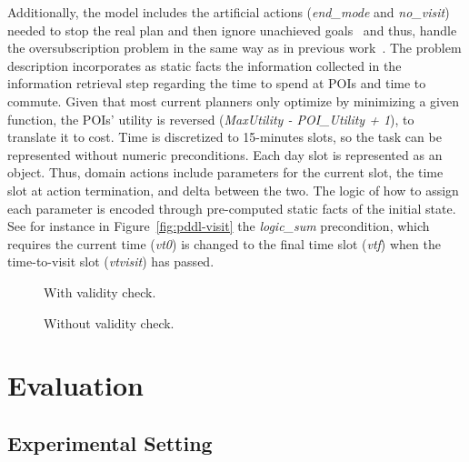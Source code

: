 \documentclass[letterpaper]{article}
\newcommand{\gpt}{{\sc GPT-4}\xspace}
\newcommand{\approach}{\ensuremath{\textsc{TRIP-PAL}}\xspace}
\begin{document}
Additionally, the model includes the artificial actions (\textit{end\_mode} and \textit{no\_visit}) needed to stop the real plan and then ignore unachieved goals~\cite{keyder2009soft} and thus, handle the oversubscription problem in the same way as in previous work~\cite{eswa-ondroad}.
The problem description incorporates as static facts the information collected in the information retrieval step regarding the time to spend at POIs and time to commute. 
Given that most current planners only optimize by minimizing a given function, the POIs' utility is reversed (\textit{MaxUtility - POI\_Utility + 1}), to translate it to cost.
Time is discretized to 15-minutes slots, so the task can be represented without numeric preconditions. Each day slot is represented as an object. Thus, domain actions include parameters for the current slot, the time slot at action termination, and delta between the two. The logic of how to assign each parameter is encoded through pre-computed static facts of the initial state.  See for instance in Figure~\ref{fig:pddl-visit} the \textit{logic\_sum} precondition, which requires the current time (\textit{vt0}) is changed to the final time slot (\textit{vtf}) when the time-to-visit slot (\textit{vtvisit}) has passed.


\begin{figure*}
    \begin{subfigure}{0.5\textwidth}
        \centering
        
        \caption{With validity check.}
        \label{fig:with_validity_check}
    \end{subfigure}\hfill
    \begin{subfigure}{0.5\textwidth}
        \centering
        
        \caption{Without validity check.}
        \label{fig:without_validity_check}
    \end{subfigure}
    \caption{Utility of the plans returned by \approach and \gpt. Points below the solid diagonal indicate that \approach generated a higher quality plan than \gpt for the given travel planning task. Points at the horizontal red line indicate that \gpt generated an invalid plan.}
    \label{fig:standard_day}
\end{figure*}

\section{Evaluation}


\subsection{Experimental Setting}
\end{document}
